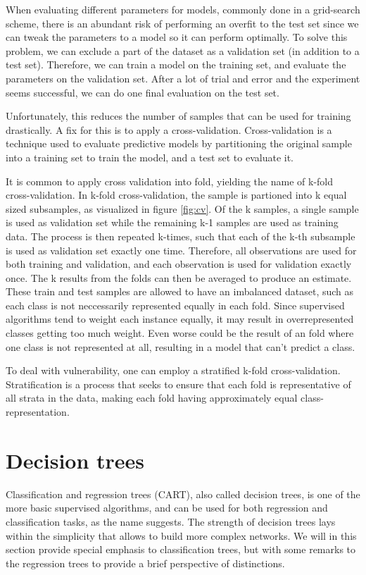 When evaluating different parameters for models, commonly done in a grid-search scheme, there is an abundant risk of performing an overfit to the test set since we can tweak the parameters to a model so it can perform optimally. To solve this problem, we can exclude a part of the dataset as a validation set (in addition to a test set). Therefore, we can train a model on the training set, and evaluate the parameters on the validation set. After a lot of trial and error and the experiment seems successful, we can do one final evaluation on the test set.

Unfortunately, this reduces the number of samples that can be used for training drastically. A fix for this is to apply a cross-validation. Cross-validation is a technique used to evaluate predictive models by partitioning the original sample into a training set to train the model, and a test set to evaluate it.



It is common to apply cross validation into fold, yielding the name of k-fold cross-validation. In k-fold cross-validation, the sample is partioned into k equal sized subsamples, as visualized in figure \ref{fig:cv}. Of the k samples, a single sample is used as validation set while the remaining k-1 samples are used as training data. The process is then repeated k-times, such that each of the k-th subsample is used as validation set exactly one time. Therefore, all observations are used for both training and validation, and each observation is used for validation exactly once. The k results from the folds can then be averaged to produce an estimate. These train and test samples are allowed to have an imbalanced dataset, such as each class is not neccessarily represented equally in each fold. Since supervised algorithms tend to weight each instance equally, it may result in overrepresented classes getting too much weight. Even worse could be the result of an fold where one class is not represented at all, resulting in a model that can't predict a class.


To deal with vulnerability, one can employ a stratified k-fold cross-validation. Stratification is a process that seeks to ensure that each fold is representative of all strata in the data, making each fold having approximately equal class-representation.

\section{Decision trees}
Classification and regression trees (CART), also called decision trees, is one of the more basic supervised algorithms, and can be used for both regression and classification tasks, as the name suggests. The strength of decision trees lays within the simplicity that allows to build more complex networks. We will in this section provide special emphasis to classification trees, but with some remarks to the regression trees to provide a brief perspective of distinctions.

